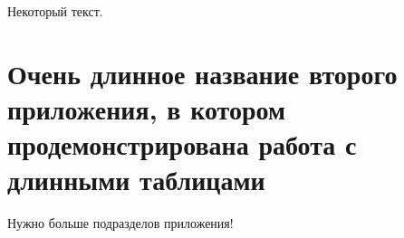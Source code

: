\begin{appendices}
 \label{AppendixA}

Некоторый текст.

\section{Очень длинное название второго приложения, в котором продемонстрирована работа с длинными таблицами} \label{AppendixB}

\begin{comment}
 \section{Подраздел приложения}\label{AppendixB1}
Вот размещается длинная таблица:

\fontsize{14pt}{15pt}\selectfont
\section{Ещё один подраздел приложения} \label{AppendixB2}

Нужно больше подразделов приложения!

\section{Очередной подраздел приложения} \label{AppendixB3}

Нужно больше подразделов приложения!

\section{И ещё один подраздел приложения} \label{AppendixB4}
\end{comment}
Нужно больше подразделов приложения!
\end{appendices}